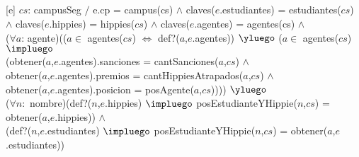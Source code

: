 \begin{Representacion}
  ~


  ~


  ~
  

  ~
  
  [e]
  {$cs$: campusSeg $/$ e.cp = campus(cs) $\land$ claves($e$.estudiantes) = estudiantes($cs$) \\ $\land$ claves($e$.hippies) = hippies($cs$) $\land$ claves($e$.agentes) = agentes(cs) $\land$ \\
  ($\forall a$: agente)(($a \in$ agentes($cs$) $\iff$ def?($a$,$e$.agentes)) $\yluego$ ($a \in$ agentes($cs$) $\impluego$ \\
  (obtener($a$,$e$.agentes).sanciones = cantSanciones($a$,$cs$) $\land$\\
  obtener($a$,$e$.agentes).premios = cantHippiesAtrapados($a$,$cs$) $\land$\\
  obtener($a$,$e$.agentes).posicion = posAgente($a$,$cs$)))) $\yluego$ \\
  ($\forall n:$ nombre)(def?($n$,$e$.hippies) $\impluego$ posEstudianteYHippie($n$,$cs$) = obtener($a$,$e$.hippies)) $\land$\\
  (def?($n$,$e$.estudiantes) $\impluego$ posEstudianteYHippie($n$,$cs$) = obtener($a$,$e$.estudiantes)) }


\end{Representacion}


